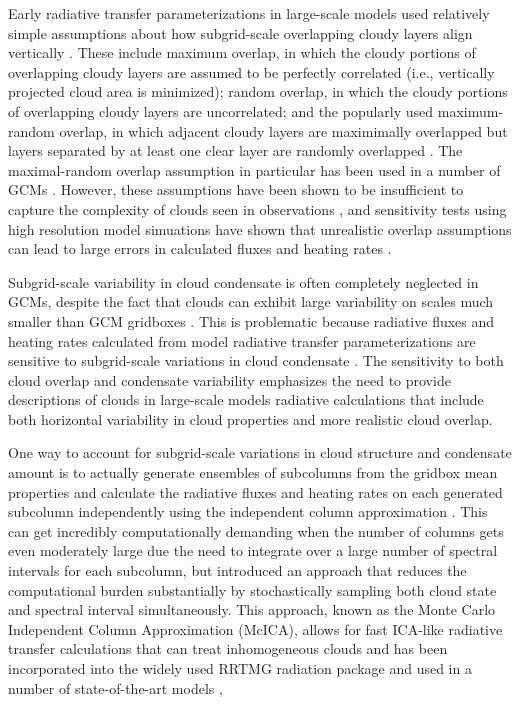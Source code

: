 \documentclass[letter]{article}
\begin{document}
Early radiative transfer parameterizations in large-scale models used relatively simple assumptions about how subgrid-scale overlapping cloudy layers align vertically \citep[e.g.][]{collins_2001}. These include maximum overlap, in which the cloudy portions of overlapping cloudy layers are assumed to be perfectly correlated (i.e., vertically projected cloud area is minimized); random overlap, in which the cloudy portions of overlapping cloudy layers are uncorrelated; and the popularly used maximum-random overlap, in which adjacent cloudy layers are maximimally overlapped but layers separated by at least one clear layer are randomly overlapped \citep{geleyn_and_hollingsworth_1979}. The maximal-random overlap assumption in particular has been used in a number of GCMs \citep[e.g.][]{cam3_description,cam4_description,cam5_description}. However, these assumptions have been shown to be insufficient to capture the complexity of clouds seen in observations \citep[e.g.][]{hogan_and_illingworth_2000,mace_and_benson-troth_2002,barker_2008}, and sensitivity tests using high resolution model simuations have shown that unrealistic overlap assumptions can lead to large errors in calculated fluxes and heating rates \citep{barker_et_al_1999,wu_and_liang_2005}.

Subgrid-scale variability in cloud condensate is often completely neglected in GCMs, despite the fact that clouds can exhibit large variability on scales much smaller than GCM gridboxes \citep[e.g.][]{stephens_and_platt_1987}. This is problematic because radiative fluxes and heating rates calculated from model radiative transfer parameterizations are sensitive to subgrid-scale variations in cloud condensate \citep[e.g.][]{barker_et_al_1999,wu_and_liang_2005,oreopoulos_et_al_2012}. The sensitivity to both cloud overlap and condensate variability emphasizes the need to provide descriptions of clouds in large-scale models radiative calculations that include both horizontal variability in cloud properties and more realistic cloud overlap.

One way to account for subgrid-scale variations in cloud structure and condensate amount is to actually generate ensembles of subcolumns from the gridbox mean properties and calculate the radiative fluxes and heating rates on each generated subcolumn independently using the independent column approximation \citep[ICA;][]{cahalan_et_al_1994}. This can get incredibly computationally demanding when the number of columns gets even moderately large due the need to integrate over a large number of spectral intervals for each subcolumn, but \cite{pincus_et_al_2003} introduced an approach that reduces the computational burden substantially by stochastically sampling both cloud state and spectral interval simultaneously. This approach, known as the Monte Carlo Independent Column Approximation (McICA), allows for fast ICA-like radiative transfer calculations that can treat inhomogeneous clouds and has been incorporated into the widely used RRTMG radiation package and used in a number of state-of-the-art models \citep{iacono_et_al_2008,von_salzen_et_al_2012,cam4_description,cam5_description,donner_et_al_2011,navgem_description},
\end{document}
